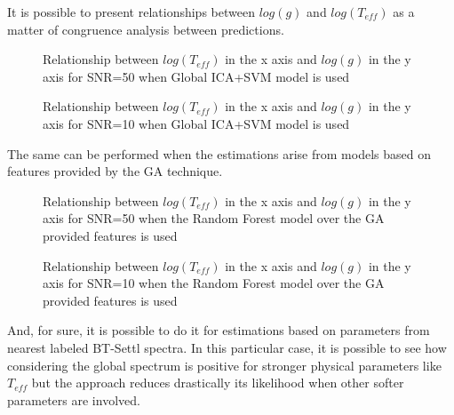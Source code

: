 {
It is possible to present relationships between $log(g)$ and $log(T_{eff})$
as a matter of congruence analysis between predictions.

\begin{figure}
 \begin{center}
 \caption{Relationship between $log(T_{eff}) $ in the x axis 
 and $log(g)$ in the y axis for SNR=50 when Global ICA+SVM model
 is used}
 \label{fig:lg_lt_bp_50}
 \end{center}
\end{figure}

\begin{figure} 
 \begin{center}
 \caption{Relationship between $log(T_{eff}) $ in the x axis 
 and $log(g)$ in the y axis for SNR=10 when Global ICA+SVM model
 is used}
 \label{fig:lg_lt_bp_50}
 \end{center}
\end{figure}

The same can be performed when the estimations arise from models 
based on features provided by the GA technique.

\begin{figure}
 \begin{center}
 \caption{Relationship between $log(T_{eff}) $ in the x axis 
 and $log(g)$ in the y axis for SNR=50 when 
 the Random Forest model over the GA provided features 
 is used}
 \label{fig:lg_lt_ga_50}
 \end{center}
\end{figure}

\begin{figure}
 \begin{center}
 \caption{Relationship between $log(T_{eff}) $ in the x axis 
 and $log(g)$ in the y axis for SNR=10 when 
 the Random Forest model over the GA provided features 
 is used}
 \label{fig:lg_lt_ga_10}
 \end{center}
\end{figure}


And, for sure, it is possible to do it for estimations based on 
parameters from nearest labeled BT-Settl spectra.
In this particular case, it is possible to see how 
considering the global spectrum is positive for stronger 
physical parameters like $T_{eff}$ but the approach
reduces drastically its likelihood when other softer 
parameters are involved.

}
